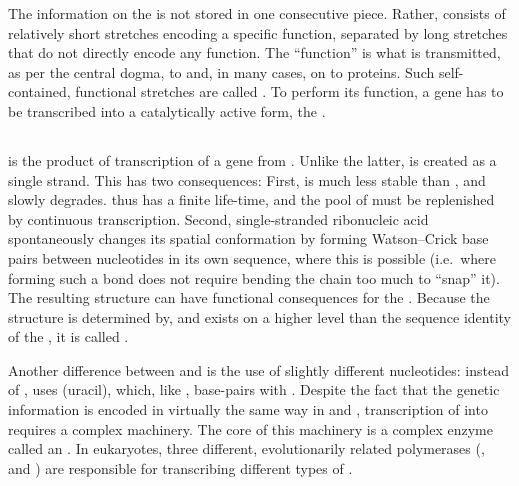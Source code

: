 The information on the \dna is not stored in one consecutive piece. Rather, \dna
consists of relatively short stretches encoding a specific function, separated
by long stretches that do not directly encode any function. The “function” is
what is transmitted, as per the central dogma, to \rna and, in many cases, on to
proteins. Such self-contained, functional stretches are called
. To perform its function, a gene has
to be transcribed into a catalytically active form, the \rna.

\subsection{}

\rna is the product of transcription of a gene from \dna. Unlike the latter,
\rna is created as a single strand. This has two consequences: First, \rna is
much less stable than \dna, and slowly degrades. \rna thus has a finite
life-time, and the pool of \rna must be replenished by continuous transcription.
Second, single-stranded ribonucleic acid spontaneously changes its spatial
conformation by forming Watson--Crick base pairs between nucleotides in its own
sequence, where this is  possible (i.e.\ where forming such a bond
does not require bending the chain too much to “snap” it). The resulting
structure can have functional consequences for the \rna. Because the structure
is determined by, and exists on a higher level than the sequence identity of the
\rna, it is called .

Another difference between \dna and \rna is the use of slightly different
nucleotides: instead of \nT, \rna uses \nU (uracil), which, like \nT, base-pairs
with \nA. Despite the fact that the genetic information is encoded in virtually
the same way in \dna and \rna, transcription of \dna into \rna requires a
complex machinery. The core of this machinery is a complex enzyme called an
. In eukaryotes, three different, evolutionarily related
\rna polymerases (,  and ) are responsible for transcribing
different types of \rna.

